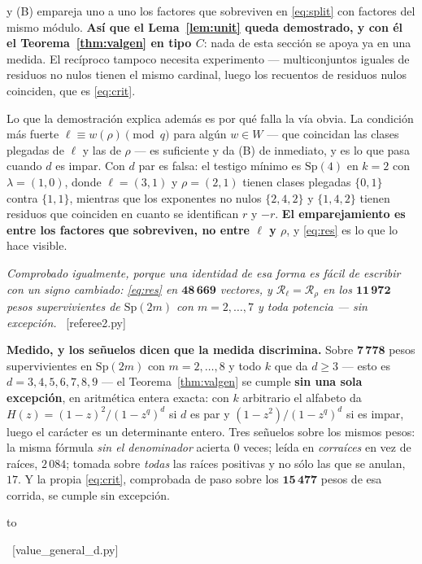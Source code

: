 \documentclass[11pt,a4paper]{article}
\newcommand{\Sp}{\mathrm{Sp}}
\newcommand{\ver}[1]{\unskip\penalty0\ \textcolor{azul}{\small\textsf{[#1]}}}
\newenvironment{keybox}
  {\par\vspace{9pt}\begin{lrbox}{\fichabox}%
   \begin{minipage}{0.90\textwidth}\vspace{7pt}\setlength{\parskip}{3pt}}
  {\vspace{7pt}\end{minipage}\end{lrbox}%
   \par\noindent\hbox to \textwidth{\hfill
   \textcolor{azul}{\rule[-\dp\fichabox]{3.2pt}{\dimexpr\ht\fichabox+\dp\fichabox\relax}}%
   \colorbox{fondoficha}{\usebox{\fichabox}}\hfill}%
   \par\vspace{9pt}}
\begin{document}
\noindent y (B) empareja uno a uno los factores que sobreviven en \eqref{eq:split} con factores del
mismo módulo. \textbf{Así que el Lema~\ref{lem:unit} queda demostrado, y con él el
Teorema~\ref{thm:valgen} en tipo $C$}: nada de esta sección se apoya ya en una medida. El recíproco
tampoco necesita experimento --- multiconjuntos iguales de residuos no nulos tienen el mismo
cardinal, luego los recuentos de residuos nulos coinciden, que es \eqref{eq:crit}.

\smallskip
\noindent Lo que la demostración explica además es por qué falla la vía obvia. La condición más
fuerte $\ell\equiv w(\rho)\pmod q$ para algún $w\in W$ --- que coincidan las clases plegadas de
$\ell$ y las de $\rho$ --- es suficiente y da (B) de inmediato, y es lo que pasa cuando $d$ es
impar. Con $d$ par es falsa: el testigo mínimo es $\Sp(4)$ en $k=2$ con $\lambda=(1,0)$, donde
$\ell=(3,1)$ y $\rho=(2,1)$ tienen clases plegadas $\{0,1\}$ contra $\{1,1\}$, mientras que los
exponentes no nulos $\{2,4,2\}$ y $\{1,4,2\}$ tienen residuos que coinciden en cuanto se
identifican $r$ y $-r$.
\textbf{El emparejamiento es entre los factores que sobreviven, no entre $\ell$ y $\rho$}, y
\eqref{eq:res} es lo que lo hace visible.

\emph{Comprobado igualmente, porque una identidad de esa forma es fácil de escribir con un signo
cambiado: \eqref{eq:res} en $\mathbf{48\,669}$ vectores, y $\mathscr{R}_\ell=\mathscr{R}_\rho$ en los
$\mathbf{11\,972}$ pesos supervivientes de $\Sp(2m)$ con $m=2,\dots,7$ y toda potencia --- sin
excepción.} \ver{referee2.py}

\begin{keybox}
\textbf{Medido, y los señuelos dicen que la medida discrimina.} Sobre $\mathbf{7\,778}$ pesos
supervivientes en $\Sp(2m)$ con $m=2,\dots,8$ y todo $k$ que da $d\ge3$ --- esto es
$d=3,4,5,6,7,8,9$ --- el Teorema~\ref{thm:valgen} se cumple \textbf{sin una sola excepción}, en
aritmética entera exacta: con $k$ arbitrario el alfabeto da $H(z)=(1-z)^2/(1-z^q)^d$ si $d$ es par y
$(1-z^2)/(1-z^q)^d$ si es impar, luego el carácter es un determinante entero. Tres señuelos sobre los
mismos pesos: la misma fórmula \emph{sin el denominador} acierta $0$ veces; leída en \emph{corraíces}
en vez de raíces, $2\,084$; tomada sobre \emph{todas} las raíces positivas y no sólo las que se
anulan, $17$. Y la propia \eqref{eq:crit}, comprobada de paso sobre los $\mathbf{15\,477}$ pesos de
esa corrida, se cumple sin excepción.
\end{keybox}
\ver{value\_general\_d.py}
\end{document}
